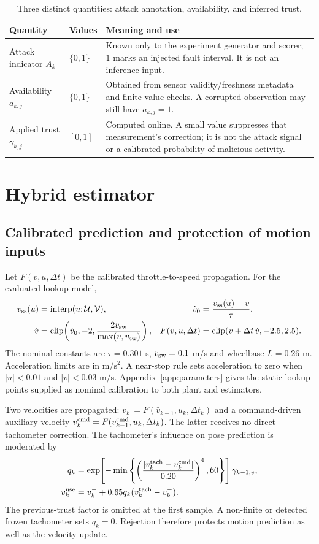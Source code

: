 ﻿\documentclass[10pt,a4paper]{article}
\newcommand{\clip}{\operatorname{clip}}
\begin{document}
\begin{table}[htbp]
\centering\small
\caption{Three distinct quantities: attack annotation, availability, and inferred trust.}
\label{tab:mask}
\begin{tabularx}{\linewidth}{@{}l l X@{}}
\toprule
Quantity & Values & Meaning and use\\
\midrule
Attack indicator $A_k$ & $\{0,1\}$ & Known only to the experiment generator and scorer;
$1$ marks an injected fault interval. It is not an inference input.\\
Availability $a_{k,j}$ & $\{0,1\}$ & Obtained from sensor validity/freshness metadata and
finite-value checks. A corrupted observation may still have $a_{k,j}=1$.\\
Applied trust $\gamma_{k,j}$ & $[0,1]$ & Computed online. A small value suppresses
that measurement's correction; it is not the attack signal or a calibrated
probability of malicious activity.\\
\bottomrule
\end{tabularx}
\end{table}

\section{Hybrid estimator}
\subsection{Calibrated prediction and protection of motion inputs}
Let $F(v,u,\Delta t)$ be the calibrated throttle-to-speed propagation.
For the evaluated lookup model,
\begin{align}
 v_{\rm ss}(u)&=\operatorname{interp}(u;\mathcal U,\mathcal V),&
 \dot v_0&=\frac{v_{\rm ss}(u)-v}{\tau}, \nonumber\\
 \dot v&=\clip\!\left(\dot v_0,-2,\frac{2v_{\rm sw}}{\max(v,v_{\rm sw})}\right),&
 F(v,u,\Delta t)&=\clip(v+\Delta t\,\dot v,-2.5,2.5).
 \label{eq:speed}
\end{align}
The nominal constants are $\tau=0.301$ s, $v_{\rm sw}=0.1$ m/s and wheelbase $L=0.26$ m.
Acceleration limits are in $\mathrm{m/s^2}$.
A near-stop rule sets acceleration to zero when $|u|<0.01$ and $|v|<0.03$ m/s.
Appendix~\ref{app:parameters} gives the static lookup points supplied as nominal
calibration to both plant and estimators.

Two velocities are propagated:
$v_k^-=F(\hat v_{k-1},u_k,\Delta t_k)$ and a command-driven auxiliary velocity
$v_k^{\rm cmd}=F(v_{k-1}^{\rm cmd},u_k,\Delta t_k)$.
The latter receives no direct tachometer correction.
The tachometer's influence on pose prediction is moderated by
\begin{align}
 q_k&=\exp\!\left[-\min\left\{
       \left(\frac{|v_k^{\rm tach}-v_k^{\rm cmd}|}{0.20}\right)^4,60\right\}\right]
       \gamma_{k-1,v}, \nonumber\\
 v_k^{\rm use}&=v_k^-+0.65q_k(v_k^{\rm tach}-v_k^-).
 \label{eq:tach}
\end{align}
The previous-trust factor is omitted at the first sample.
A non-finite or detected frozen tachometer sets $q_k=0$.
Rejection therefore protects motion prediction as well as the velocity update.
\end{document}

